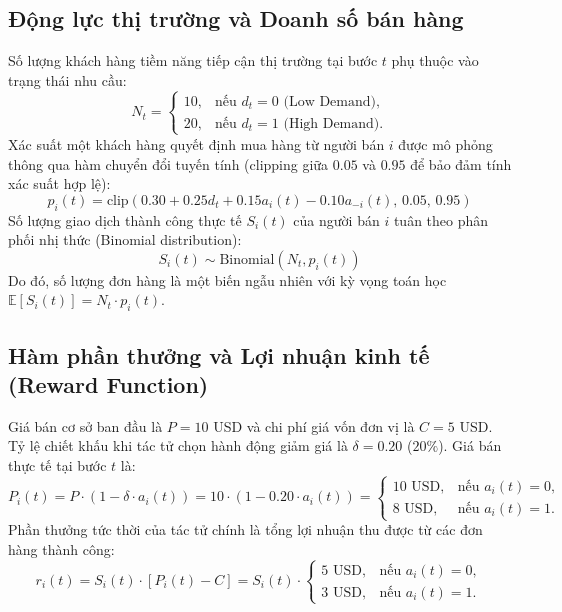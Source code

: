 \documentclass[12pt,a4paper]{article}
\begin{document}
\subsection{Động lực thị trường và Doanh số bán hàng}
Số lượng khách hàng tiềm năng tiếp cận thị trường tại bước $t$ phụ thuộc vào trạng thái nhu cầu:
\begin{equation}
N_t = \begin{cases} 
10, & \text{nếu } d_t = 0 \text{ (Low Demand)}, \\ 
20, & \text{nếu } d_t = 1 \text{ (High Demand)}. 
\end{cases}
\end{equation}
Xác suất một khách hàng quyết định mua hàng từ người bán $i$ được mô phỏng thông qua hàm chuyển đổi tuyến tính (clipping giữa $0.05$ và $0.95$ để bảo đảm tính xác suất hợp lệ):
\begin{equation}
p_i(t) = \text{clip}\left(0.30 + 0.25 d_t + 0.15 a_i(t) - 0.10 a_{-i}(t), \, 0.05, \, 0.95\right)
\end{equation}
Số lượng giao dịch thành công thực tế $S_i(t)$ của người bán $i$ tuân theo phân phối nhị thức (Binomial distribution):
\begin{equation}
S_i(t) \sim \text{Binomial}(N_t, p_i(t))
\end{equation}
Do đó, số lượng đơn hàng là một biến ngẫu nhiên với kỳ vọng toán học $\mathbb{E}[S_i(t)] = N_t \cdot p_i(t)$.

\subsection{Hàm phần thưởng và Lợi nhuận kinh tế (Reward Function)}
Giá bán cơ sở ban đầu là $P = 10$ USD và chi phí giá vốn đơn vị là $C = 5$ USD. Tỷ lệ chiết khấu khi tác tử chọn hành động giảm giá là $\delta = 0.20$ ($20\%$). Giá bán thực tế tại bước $t$ là:
\begin{equation}
P_i(t) = P \cdot (1 - \delta \cdot a_i(t)) = 10 \cdot (1 - 0.20 \cdot a_i(t)) = \begin{cases}
10 \text{ USD}, & \text{nếu } a_i(t) = 0, \\
8 \text{ USD}, & \text{nếu } a_i(t) = 1.
\end{cases}
\end{equation}
Phần thưởng tức thời của tác tử chính là tổng lợi nhuận thu được từ các đơn hàng thành công:
\begin{equation}
r_i(t) = S_i(t) \cdot \left[ P_i(t) - C \right] = S_i(t) \cdot \begin{cases}
5 \text{ USD}, & \text{nếu } a_i(t) = 0, \\
3 \text{ USD}, & \text{nếu } a_i(t) = 1.
\end{cases}
\end{equation}
\end{document}
